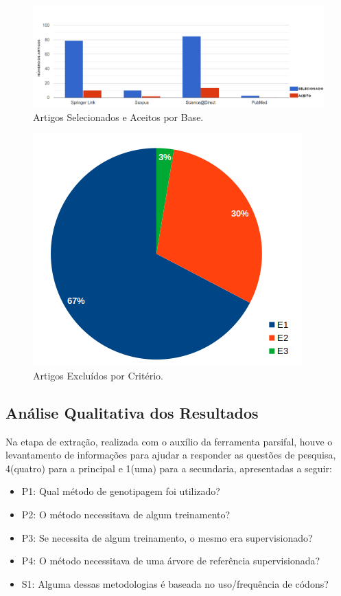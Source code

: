 \documentclass[12pt]{article}
\begin{document}
\begin{figure}[tb]
    \centering
    \includegraphics[scale=0.42]{figuras/_artigosAceitosSelecionados.png}
    \caption{Artigos Selecionados e Aceitos por Base.}\label{fig:artigoBases}
\end{figure}

\begin{figure}[tb]
    \centering
    \includegraphics[scale=0.5]{figuras/_artigosExcluidosPorCriterio.png}
    \caption{Artigos Excluídos por Critério.}\label{fig:excluidosCriterios}
\end{figure}


\subsection{Análise Qualitativa dos Resultados}

Na etapa de extração, realizada com o auxílio da ferramenta \gls{parsifal}, houve o levantamento de informações para ajudar a responder as questões de pesquisa, 4(quatro) para a principal e 1(uma) para a secundaria, apresentadas a seguir: \\

\begin{itemize}
    \item P1: Qual método de genotipagem foi utilizado?
    \item P2: O método necessitava de algum treinamento?
    \item P3: Se necessita de algum treinamento, o mesmo era supervisionado?
    \item P4: O método necessitava de uma árvore de referência supervisionada?
    \item S1: Alguma dessas metodologias é baseada no uso/frequência de códons?
\end{itemize}
\end{document}
